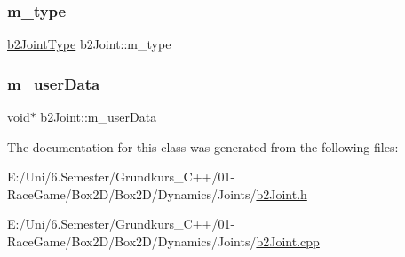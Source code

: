\subsubsection{\texorpdfstring{m\_type}{m\_type}}
{\footnotesize\ttfamily \mbox{\hyperlink{b2_joint_8h_a0bb202d8a286c888a11985b07b2272ab}{b2\+Joint\+Type}} b2\+Joint\+::m\+\_\+type\hspace{0.3cm}{\ttfamily [protected]}}

\mbox{\label{classb2_joint_ae8a31b6d5d6e76ccf7c975b2b3ae7366}} 
\subsubsection{\texorpdfstring{m\_userData}{m\_userData}}
{\footnotesize\ttfamily void$\ast$ b2\+Joint\+::m\+\_\+user\+Data\hspace{0.3cm}{\ttfamily [protected]}}



The documentation for this class was generated from the following files\+:\begin{DoxyCompactItemize}
\item 
E\+:/\+Uni/6.\+Semester/\+Grundkurs\+\_\+\+C++/01-\/\+Race\+Game/\+Box2\+D/\+Box2\+D/\+Dynamics/\+Joints/\mbox{\hyperlink{b2_joint_8h}{b2\+Joint.\+h}}\item 
E\+:/\+Uni/6.\+Semester/\+Grundkurs\+\_\+\+C++/01-\/\+Race\+Game/\+Box2\+D/\+Box2\+D/\+Dynamics/\+Joints/\mbox{\hyperlink{b2_joint_8cpp}{b2\+Joint.\+cpp}}\end{DoxyCompactItemize}
